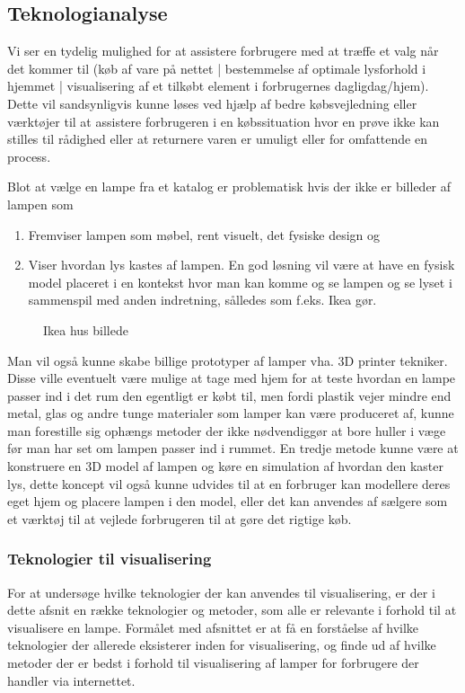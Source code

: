 \subsection{Teknologianalyse}
\label{sec:teknologianalyse}
Vi ser en tydelig mulighed for at assistere forbrugere med at træffe et valg når det kommer til (køb af vare på nettet | bestemmelse af optimale lysforhold i hjemmet | visualisering af et tilkøbt element i forbrugernes dagligdag/hjem). Dette vil sandsynligvis kunne løses ved hjælp af bedre købsvejledning eller værktøjer til at assistere forbrugeren i en købssituation hvor en prøve ikke kan stilles til rådighed eller at returnere varen er umuligt eller for omfattende en process.

Blot at vælge en lampe fra et katalog er problematisk hvis der ikke er billeder af lampen som 
\begin{enumerate}
    \item Fremviser lampen som møbel, rent visuelt, det fysiske design og 
    \item Viser hvordan lys kastes af lampen. En god løsning vil være at have en fysisk model placeret i en kontekst hvor man kan komme og se lampen og se lyset i sammenspil med anden indretning, sålledes som f.eks. Ikea gør.
\end{enumerate}
\begin{figure}[H]
    \centering
    \fbox{\rule{\textwidth}{5cm}}
    \caption{Ikea hus billede}
\end{figure} 

Man vil også kunne skabe billige prototyper af lamper vha. 3D printer tekniker. Disse ville eventuelt være mulige at tage med hjem for at teste hvordan en lampe passer ind i det rum den egentligt er købt til, men fordi plastik vejer mindre end metal, glas og andre tunge materialer som lamper kan være produceret af, kunne man forestille sig ophængs metoder der ikke nødvendiggør at bore huller i væge før man har set om lampen passer ind i rummet.
\newline En tredje metode kunne være at konstruere en 3D model af lampen og køre en simulation af hvordan den kaster lys, dette koncept vil også kunne udvides til at en forbruger kan modellere deres eget hjem og placere lampen i den model, eller det kan anvendes af sælgere som et værktøj til at vejlede forbrugeren til at gøre det rigtige køb.


\subsubsection{Teknologier til visualisering}
For at undersøge hvilke teknologier der kan anvendes til visualisering, er der i dette afsnit en række teknologier og metoder, som alle er relevante i forhold til at visualisere en lampe. Formålet med afsnittet er at få en forståelse af hvilke teknologier der allerede eksisterer inden for visualisering, og finde ud af hvilke metoder der er bedst i forhold til visualisering af lamper for forbrugere der handler via internettet.

